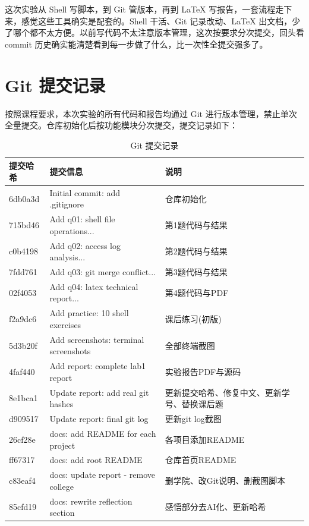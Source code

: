 \documentclass[12pt,a4paper]{article}
\begin{document}
这次实验从 Shell 写脚本，到 Git 管版本，再到 LaTeX 写报告，一套流程走下来，感觉这些工具确实是配套的。Shell 干活、Git 记录改动、LaTeX 出文档，少了哪个都不太方便。以前写代码不太注意版本管理，这次按要求分次提交，回头看 commit 历史确实能清楚看到每一步做了什么，比一次性全提交强多了。

\section{Git 提交记录}

按照课程要求，本次实验的所有代码和报告均通过 Git 进行版本管理，禁止单次全量提交。仓库初始化后按功能模块分次提交，提交记录如下：

\begin{table}[H]
\centering
\caption{Git 提交记录}
\label{tab:gitlog}
\begin{tabular}{lll}
\toprule
提交哈希 & 提交信息 & 说明 \\
\midrule
6db0a3d & Initial commit: add .gitignore & 仓库初始化 \\
715bd46 & Add q01: shell file operations... & 第1题代码与结果 \\
c0b4198 & Add q02: access log analysis... & 第2题代码与结果 \\
7fdd761 & Add q03: git merge conflict... & 第3题代码与结果 \\
02f4053 & Add q04: latex technical report... & 第4题代码与PDF \\
f2a9dc6 & Add practice: 10 shell exercises & 课后练习(初版) \\
5d3b20f & Add screenshots: terminal screenshots & 全部终端截图 \\
4faf440 & Add report: complete lab1 report & 实验报告PDF与源码 \\
8e1bca1 & Update report: add real git hashes & 更新提交哈希、修复中文、更新学号、替换课后题 \\
d909517 & Update report: final git log & 更新git log截图 \\
26cf28e & docs: add README for each project & 各项目添加README \\
ff67317 & docs: add root README & 仓库首页README \\
c83eaf4 & docs: update report - remove college & 删学院、改Git说明、删截图脚本 \\
85cfd19 & docs: rewrite reflection section & 感悟部分去AI化、更新哈希 \\
\bottomrule
\end{tabular}
\end{table}
\end{document}
